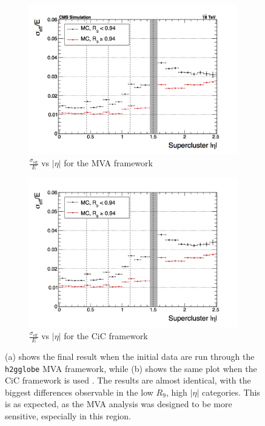 \documentclass[10pt]{article}
\begin{document}
\begin{figure}[h!]
  \centering
  \begin{subfigure}{0.42\textwidth}
\includegraphics[width=\textwidth]{"EffSigma_vs_eta_mva"}
\caption{$\frac{\sigma_\text{eff}}{E}$ vs $|\eta|$ for the MVA framework}
\end{subfigure}
  \begin{subfigure}{0.42\textwidth}
  
\includegraphics[width=\textwidth]{"EffSigma_vs_eta_cic"}
\caption{$\frac{\sigma_\text{eff}}{E}$ vs $|\eta|$ for the CiC framework}
\end{subfigure}
\caption{(a) shows the final result when the initial data are run through the \texttt{h2gglobe} MVA framework, while (b) shows the same plot when the CiC framework is used . The results are almost identical, with the biggest differences observable in the low $R_9$, high $|\eta|$ categories. This is as expected, as the MVA analysis was designed to be more sensitive, especially in this region.}
\label{cicPlot}
\end{figure}
\end{document}
